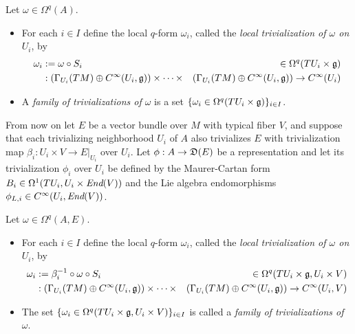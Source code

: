\begin{definition}\label{definitionLocalTrivializationOfScalarValuedForms}
Let $\omega \in \Omega^q(A)$.
    \begin{itemize}
    
    \item For each $i \in I$ define the local $q$-form $\omega_i$, called the \emph{local trivialization of $\omega$ on $U_i$}, by
    \begin{align}
        \omega_i &:= \omega \circ S_i  & \in \Omega^q(TU_i\times \mathfrak{g})\\
        &:\left( \Gamma_{U_i}(TM)\oplus C^\infty({U_i}, \mathfrak{g}) \right) \times \cdots \times &\left( \Gamma_{U_i}(TM)\oplus C^\infty({U_i}, \mathfrak{g}) \right) \to C^\infty({U_i})
    \end{align}
    
    \item A \emph{family of trivializations of $\omega$} is a set $\{\omega_i \in \Omega^q(TU_i \times \mathfrak{g})\}_{i \in I}$.
    
    \end{itemize}

\end{definition}

From now on let $E$ be a vector bundle over $M$ with typical fiber $V$, and suppose that each trivializing neighborhood $U_i$ of $A$ also trivializes $E$ with trivialization map $\beta_i: U_i \times V \to E|_{U_i}$ over $U_i$. Let $\phi:A \to \alg D(E)$ be a representation and let its trivialization $\phi_i$ over $U_i$ be defined by the Maurer-Cartan form $B_i \in \Omega^1(TU_i, U_i \times \operatorname{\textit{End}}(V))$ and the Lie algebra endomorphisms $\phi_{L,i} \in C^\infty(U_i, \End(V))$.

\begin{definition}\label{definitionLocalTrivializationOfEValuedForms}
Let $\omega \in \Omega^q(A, E)$.
    \begin{itemize}
    
    \item For each $i \in I$ define the local $q$-form $\omega_i$, called the \emph{local trivialization of $\omega$ on $U_i$}, by
    \begin{align}
        \omega_i &:= \beta_i^{-1} \circ \omega \circ S_i  & \in \Omega^q(TU_i\times \mathfrak{g}, {U_i} \times V)\\
        &:\left( \Gamma_{U_i}(TM)\oplus C^\infty({U_i}, \mathfrak{g}) \right) \times \cdots \times &\left( \Gamma_{U_i}(TM)\oplus C^\infty({U_i}, \mathfrak{g}) \right) \to C^\infty({U_i}, V)
    \end{align}
    
    \item The set $\{\omega_i \in \Omega^q(TU_i\times \mathfrak{g}, U_i \times V)\}_{i \in I}$ is called a \emph{family of trivializations of $\omega$}.
    
    \end{itemize}

\end{definition}

